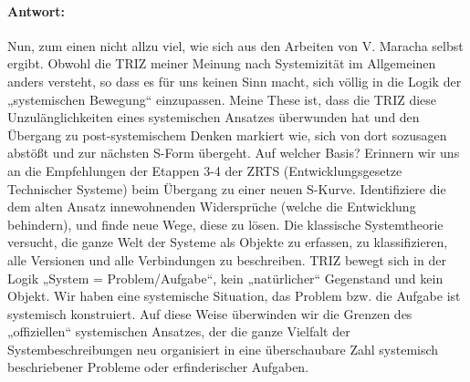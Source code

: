 \documentclass[11pt,a4paper]{article}
\begin{document}
\paragraph{Antwort:}
Nun, zum einen nicht allzu viel, wie sich aus den Arbeiten von V. Maracha
selbst ergibt.  Obwohl die TRIZ meiner Meinung nach Systemizität im
Allgemeinen anders versteht, so dass es für uns keinen Sinn macht, sich völlig
in die Logik der „systemischen Bewegung“ einzupassen. Meine These ist, dass
die TRIZ diese Unzulänglichkeiten eines systemischen Ansatzes überwunden hat
und den Übergang zu post-systemischem Denken markiert wie, sich von dort
sozusagen abstößt und zur nächsten S-Form übergeht. Auf welcher Basis?
Erinnern wir uns an die Empfehlungen der Etappen 3-4 der ZRTS
(Entwicklungsgesetze Technischer Systeme) beim Übergang zu einer neuen
S-Kurve. Identifiziere die dem alten Ansatz innewohnenden Widersprüche (welche
die Entwicklung behindern), und finde neue Wege, diese zu lösen.  Die
klassische Systemtheorie versucht, die ganze Welt der Systeme als Objekte zu
erfassen, zu klassifizieren, alle Versionen und alle Verbindungen zu
beschreiben. TRIZ bewegt sich in der Logik „System = Problem/Aufgabe“, kein
„natürlicher“ Gegenstand und kein Objekt. Wir haben eine systemische
Situation, das Problem bzw. die Aufgabe ist systemisch konstruiert. Auf diese
Weise überwinden wir die Grenzen des „offiziellen“ systemischen Ansatzes, der
die ganze Vielfalt der Systembeschreibungen neu organisiert in eine
überschaubare Zahl systemisch beschriebener Probleme oder erfinderischer
Aufgaben.
\end{document}
